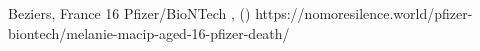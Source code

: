           {
            Beziers, France
          }
          {
            16
          }
          {
            Pfizer/BioNTech
          }
          {
          }
          {
            ,
             ()
          }
          {
            https://nomoresilence.world/pfizer-biontech/melanie-macip-aged-16-pfizer-death/
          }

